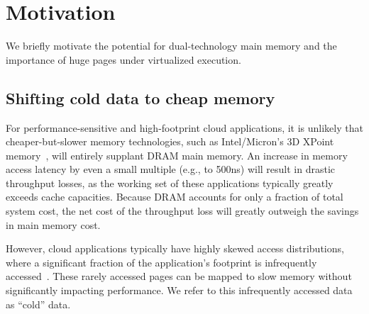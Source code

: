 \section{Motivation}
\label{motivation}

We briefly motivate the potential for dual-technology main memory and the importance of huge pages under virtualized execution.

%

\subsection{Shifting cold data to cheap memory}
\label{analytic-model}

For performance-sensitive and high-footprint cloud applications, it is unlikely that cheaper-but-slower
memory technologies, such as Intel/Micron's 3D XPoint memory~\cite{3dcrosspoint}, will 
entirely supplant DRAM main memory.
An increase in memory access latency by even a small multiple (e.g., to 500ns)
will result in drastic throughput losses, as the working set of these applications typically
greatly exceeds cache capacities.
Because DRAM accounts for only a fraction of total system cost, the net cost of the
throughput loss will greatly outweigh the savings in main memory cost.

However, cloud applications typically have highly skewed access distributions, where
a significant fraction of the application's footprint is infrequently
accessed~\cite{ycsb}.
These rarely accessed pages can be mapped to slow memory without significantly impacting performance.
We refer to this infrequently accessed data as ``cold'' data.

